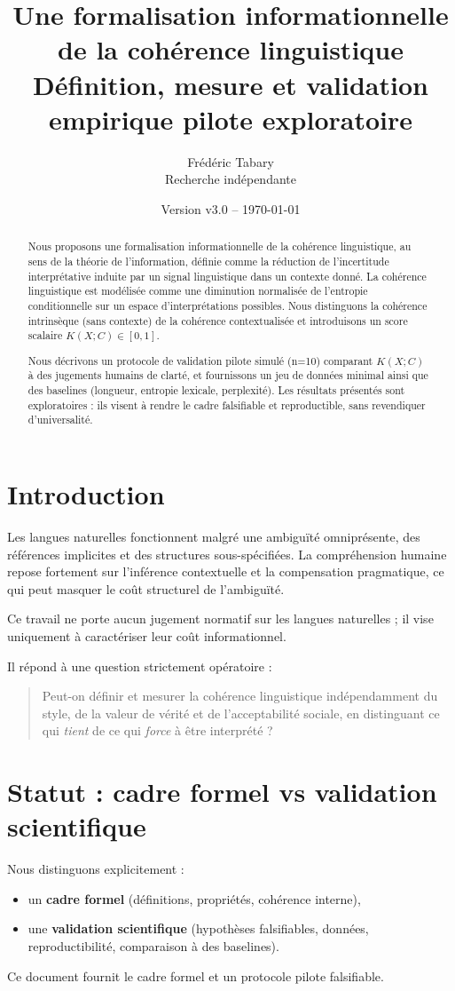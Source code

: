 \documentclass[11pt,a4paper]{article}
\title{\textbf{Une formalisation informationnelle de la cohérence linguistique}\\
\large Définition, mesure et validation empirique pilote exploratoire}
\author{Frédéric Tabary\\
\small Recherche indépendante}
\date{\small Version v3.0 -- \today}
\begin{document}
\maketitle

\begin{abstract}
Nous proposons une formalisation informationnelle de la cohérence linguistique, au sens de la théorie de l’information, définie comme la réduction de l’incertitude interprétative induite par un signal linguistique dans un contexte donné. La cohérence linguistique est modélisée comme une diminution normalisée de l’entropie conditionnelle sur un espace d’interprétations possibles. Nous distinguons la cohérence intrinsèque (sans contexte) de la cohérence contextualisée et introduisons un score scalaire $K(X;C)\in[0,1]$.

Nous décrivons un protocole de validation pilote simulé (n=10) comparant $K(X;C)$ à des jugements humains de clarté, et fournissons un jeu de données minimal ainsi que des baselines (longueur, entropie lexicale, perplexité). Les résultats présentés sont exploratoires : ils visent à rendre le cadre falsifiable et reproductible, sans revendiquer d’universalité.
\end{abstract}

\section{Introduction}
Les langues naturelles fonctionnent malgré une ambiguïté omniprésente, des références implicites et des structures sous-spécifiées. La compréhension humaine repose fortement sur l’inférence contextuelle et la compensation pragmatique, ce qui peut masquer le coût structurel de l’ambiguïté.

Ce travail ne porte aucun jugement normatif sur les langues naturelles ; il vise uniquement à caractériser leur coût informationnel.

Il répond à une question strictement opératoire :
\begin{quote}
Peut-on définir et mesurer la cohérence linguistique indépendamment du style, de la valeur de vérité et de l’acceptabilité sociale, en distinguant ce qui \emph{tient} de ce qui \emph{force} à être interprété ?
\end{quote}

\section{Statut : cadre formel vs validation scientifique}
Nous distinguons explicitement :
\begin{itemize}
\item un \textbf{cadre formel} (définitions, propriétés, cohérence interne),
\item une \textbf{validation scientifique} (hypothèses falsifiables, données, reproductibilité, comparaison à des baselines).
\end{itemize}
Ce document fournit le cadre formel et un protocole pilote falsifiable.
\end{document}
